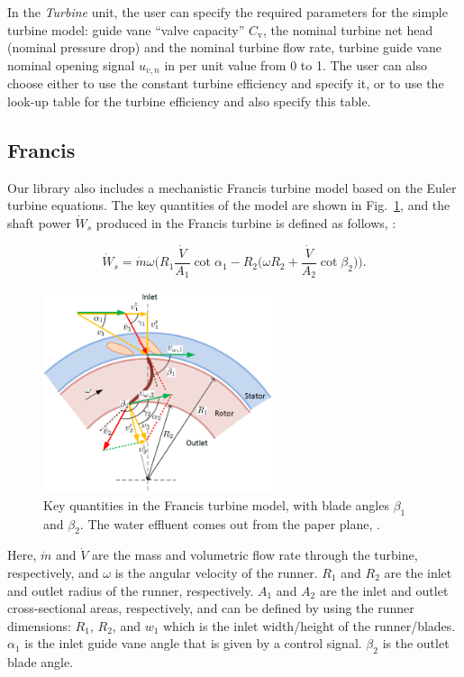 \documentclass[%
]{USN-PhD}
\begin{document}
In the \emph{Turbine} unit, the user can specify the required parameters for the simple turbine model:  guide vane ``valve capacity'' $C_\mathrm{v}$, the nominal turbine net head (nominal pressure drop) and the nominal turbine flow rate, turbine guide vane nominal opening signal  $u_{v,n}$ in per unit value from 0 to 1. The user can also choose either to use the constant turbine efficiency and specify it, or to use the look-up table for the turbine efficiency and also specify this table.

\subsection{Francis}

 Our library also includes a mechanistic Francis turbine model based on the Euler turbine equations. The key quantities of the model are shown in Fig.~\ref{fig:fig11}, and the shaft power $\dot{W}_s$ produced in the Francis turbine is defined as follows, \cite{LieL:18,Vyt:18}:

\begin{equation} \label{eq:eq37}
{\dot{W}_s} = \dot{m}\omega \Big(R_1\frac{\dot{V}}{A_1}\cot{\alpha_1}-R_2\big(\omega R_2+\frac{\dot{V}}{A_2}\cot{\beta_2}\big)\Big).
\end{equation}

\begin{figure}
\centering
\includegraphics[width=0.6\textwidth]{fig/Fig_2_F_turb}    %
\caption{Key quantities in the Francis turbine model, with blade angles $\beta_1$ and $\beta_2$. The water effluent comes out from the paper plane, \cite{LieL:18}.}
\label{fig:fig11}
\end{figure}

Here, $\dot{m}$ and $\dot{V}$ are the mass and volumetric flow rate through the turbine, respectively, and $\omega$ is the angular velocity of the runner. $R_1$ and $R_2$ are the inlet and outlet radius of the runner, respectively. $A_1$ and $A_2$ are the inlet and outlet cross-sectional areas, respectively, and can be defined by using the runner dimensions: $R_1$, $R_2$, and $w_1$ which is the inlet width/height of the runner/blades. $\alpha_1$ is the inlet guide vane angle that is given by a control signal. $\beta_2$ is the outlet blade angle.
\end{document}
